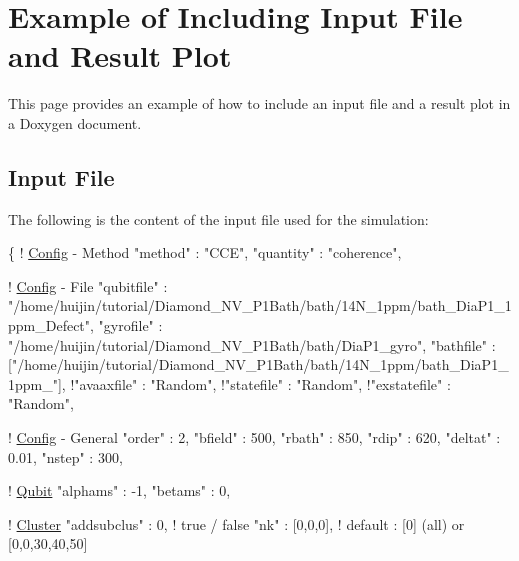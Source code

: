 \section*{Example of Including Input File and Result Plot}

This page provides an example of how to include an input file and a result plot in a Doxygen document.

\subsection*{Input File}

The following is the content of the input file used for the simulation\-:


\begin{DoxyCodeInclude}
\{
    ! \hyperlink{structConfig}{Config} - Method 
    \textcolor{stringliteral}{"method"}        : \textcolor{stringliteral}{"CCE"}, 
    \textcolor{stringliteral}{"quantity"}      : \textcolor{stringliteral}{"coherence"},
    
    ! \hyperlink{structConfig}{Config} - File
    \textcolor{stringliteral}{"qubitfile"}     :  \textcolor{stringliteral}{"/home/huijin/tutorial/Diamond\_NV\_P1Bath/bath/14N\_1ppm/bath\_DiaP1\_1ppm\_Defect"},
    \textcolor{stringliteral}{"gyrofile"}      :  \textcolor{stringliteral}{"/home/huijin/tutorial/Diamond\_NV\_P1Bath/bath/DiaP1\_gyro"},
    \textcolor{stringliteral}{"bathfile"}      : [\textcolor{stringliteral}{"/home/huijin/tutorial/Diamond\_NV\_P1Bath/bath/14N\_1ppm/bath\_DiaP1\_1ppm\_"}],
  !\textcolor{stringliteral}{"avaaxfile"}     :  \textcolor{stringliteral}{"Random"},
  !\textcolor{stringliteral}{"statefile"}     :  \textcolor{stringliteral}{"Random"},
  !\textcolor{stringliteral}{"exstatefile"}   :  \textcolor{stringliteral}{"Random"},

    ! \hyperlink{structConfig}{Config} - General
    \textcolor{stringliteral}{"order"}         : 2,
    \textcolor{stringliteral}{"bfield"}        : 500,
    \textcolor{stringliteral}{"rbath"}         : 850,
    \textcolor{stringliteral}{"rdip"}          : 620,
    \textcolor{stringliteral}{"deltat"}        : 0.01,
    \textcolor{stringliteral}{"nstep"}         : 300,  

    ! \hyperlink{structQubit}{Qubit} 
    \textcolor{stringliteral}{"alphams"}     : -1,
    \textcolor{stringliteral}{"betams"}      : 0,

    ! \hyperlink{structCluster}{Cluster}
    \textcolor{stringliteral}{"addsubclus"}  : 0, ! \textcolor{keyword}{true} / \textcolor{keyword}{false}
    \textcolor{stringliteral}{"nk"}          : [0,0,0], ! \textcolor{keywordflow}{default} : [0] (all) or [0,0,30,40,50]


\end{DoxyCodeInclude}

